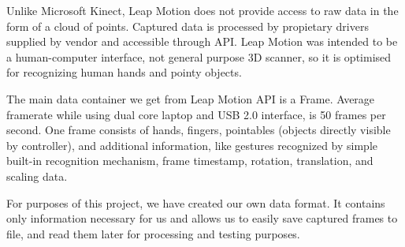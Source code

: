 Unlike Microsoft Kinect, Leap Motion does not provide access to raw data in the form of a cloud of points. Captured data is processed by propietary drivers supplied by vendor and accessible through API. Leap Motion was intended to be a human-computer interface, not general purpose 3D scanner, so it is optimised for recognizing human hands and pointy objects.

The main data container we get from Leap Motion API is a Frame. Average framerate while using dual core laptop and USB 2.0 interface, is 50 frames per second. One frame consists of hands, fingers, pointables (objects directly visible by controller), and additional information, like gestures recognized by simple built-in recognition mechanism, frame timestamp, rotation, translation, and scaling data. 

For purposes of this project, we have created our own data format. It contains only information necessary for us and allows us to easily save captured frames to file, and read them later for processing and testing purposes.
